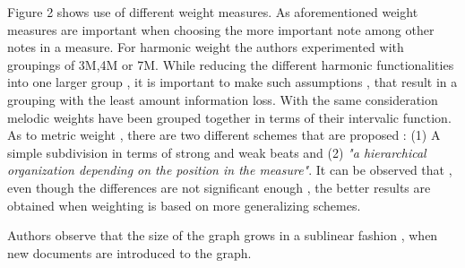 \documentclass{llncs}
\begin{document}
			Figure 2 shows use of different weight measures. As aforementioned weight measures are important when choosing the more important note among other notes in a measure. For harmonic weight the authors experimented with groupings of 3M,4M or 7M. While reducing the different harmonic functionalities into one larger group , it is important to make such assumptions , that result in a grouping with the least amount information loss. With the same consideration melodic weights have been grouped together in terms of their intervalic function. As to metric weight , there are two different schemes that are proposed : (1) A simple subdivision in terms of strong and weak beats and (2) \textit{"a hierarchical organization depending on the position in the measure"}. It can be observed that , even though the differences are not significant enough , the better results are obtained when weighting is based on more generalizing schemes.

			Authors observe that the size of the graph grows in a sublinear fashion , when new documents are introduced to the graph.   
\end{document}
